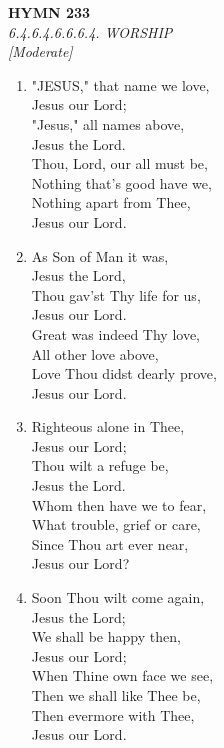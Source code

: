 \newpage
\begin{center}
    {\Large \textbf{HYMN 233}}
    \\
    \textit{6.4.6.4.6.6.6.4. WORSHIP}
    \\
    \textit{\small [Moderate]}
\end{center}
\vspace{1em}

\begin{enumerate}
    \item "JESUS," that name we love, \\
            Jesus our Lord; \\
        "Jesus," all names above, \\
            Jesus the Lord. \\
        Thou, Lord, our all must be, \\
        Nothing that's good have we, \\
        Nothing apart from Thee, \\
            Jesus our Lord.

    \item As Son of Man it was, \\
            Jesus the Lord, \\
        Thou gav'st Thy life for us, \\
            Jesus our Lord. \\
        Great was indeed Thy love, \\
        All other love above, \\
        Love Thou didst dearly prove, \\
            Jesus our Lord.

    \item Righteous alone in Thee, \\
            Jesus our Lord; \\
        Thou wilt a refuge be, \\
            Jesus the Lord. \\
        Whom then have we to fear, \\
        What trouble, grief or care, \\
        Since Thou art ever near, \\
            Jesus our Lord?

    \item Soon Thou wilt come again, \\
            Jesus the Lord; \\
        We shall be happy then, \\
            Jesus our Lord; \\
        When Thine own face we see, \\
        Then we shall like Thee be, \\
        Then evermore with Thee, \\
            Jesus our Lord.

\end{enumerate}

